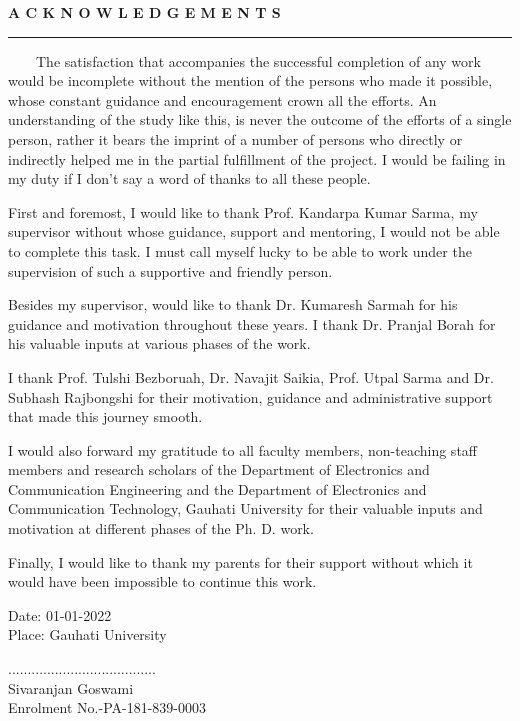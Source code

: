 \begin{center}
{\bf \large A C K N O W L E D G E M E N T S}
\end{center}
\rule{\linewidth}{2mm} \pagestyle{empty} \vspace{0.25in}

~~~~The satisfaction that accompanies the successful completion of any work would be incomplete without the mention of the persons who made it possible, whose constant guidance and encouragement crown all the efforts. An understanding of the study like this, is never the outcome of the efforts of a single person, rather it bears the imprint of a number of persons who directly or indirectly helped me in the partial fulfillment of the project. I would be failing in my duty if I don't say a word of thanks to all these people.

First and foremost, I would like to thank Prof. Kandarpa Kumar Sarma, my supervisor without whose guidance, support and mentoring, I would not be able to complete this task. I must call myself lucky to be able to work under the supervision of such a supportive and friendly person.

Besides my supervisor, would like to thank Dr. Kumaresh Sarmah for his guidance and motivation throughout these years. I thank Dr. Pranjal Borah for his valuable inputs at various phases of the work.

I thank Prof. Tulshi Bezboruah, Dr. Navajit Saikia, Prof. Utpal Sarma and Dr. Subhash Rajbongshi for their motivation, guidance and administrative support that made this journey smooth.

I would also forward my gratitude to all faculty members, non-teaching staff members and research scholars of the Department of Electronics and Communication Engineering and the Department of Electronics and Communication Technology, Gauhati University for their valuable inputs and motivation at different phases of the Ph. D. work.

Finally, I would like to thank my parents for their support without which it would have been impossible to continue this work.

\vspace*{11mm}





\goodbreak
\begin{multicols}{2}
\begin{flushleft}
Date: 01-01-2022 \\
Place: Gauhati University \\
\end{flushleft}

\begin{flushright}
...................................... \\
Sivaranjan Goswami \\
Enrolment No.-PA-181-839-0003\\
\end{flushright}
\end{multicols}
